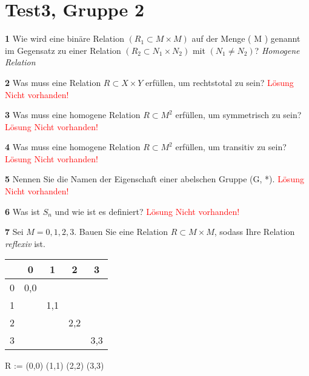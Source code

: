\documentclass[11pt]{article}
\begin{document}
\section{Test3, Gruppe 2}
    \textbf{1} Wie wird eine binäre Relation $( R_1 \subset M \times M )$ auf der Menge ( M ) genannt im Gegensatz zu einer Relation $( R_2 \subset N_1 \times N_2 )$ mit $( N_1 \neq N_2 )$?\newline
    {\itshape Homogene Relation}\newline

    \textbf{2} Was muss eine Relation \( R \subset X \times Y \) erfüllen, um rechtstotal zu sein?\newline
    \textcolor{red}{Lösung Nicht vorhanden!}\newline

    \textbf{3} Was muss eine homogene Relation \( R \subset M^2 \) erfüllen, um symmetrisch zu sein?\newline
    \textcolor{red}{Lösung Nicht vorhanden!}\newline

    \textbf{4} Was muss eine homogene Relation \( R \subset M^2 \) erfüllen, um transitiv zu sein?\newline
    \textcolor{red}{Lösung Nicht vorhanden!}\newline

    \textbf{5} Nennen Sie die Namen der Eigenschaft einer abelschen Gruppe (G, *).\newline
    \textcolor{red}{Lösung Nicht vorhanden!}\newline

    \textbf{6} Was ist $S_n$ und wie ist es definiert?\newline
    \textcolor{red}{Lösung Nicht vorhanden!}\newline

    \textbf{7} Sei $M = {0,1,2,3}$. Bauen Sie eine Relation $R \subset M \times M$, sodass Ihre Relation {\itshape reflexiv} ist.\newline
\begin{tabular}{c|cccc}
    & 0 & 1 & 2 & 3 \\
    \hline
    0 & 0,0 & & & \\
    1 & & 1,1 & & \\
    2 & & & 2,2 & \\
    3 & & & & 3,3 \\
\end{tabular}\newline
R := {(0,0) (1,1) (2,2) (3,3)}\newline
\end{document}
